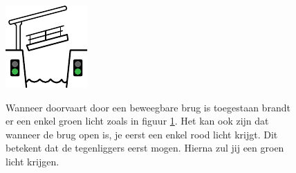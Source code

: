 \begin{figure}[H]
	\centering
	\begin{minipage}[b]{0.18\textwidth}
		\includegraphics[width=\textwidth,]{Hoofdstukken/Bruggen/pdf/brug_toegestaan.pdf}
		\caption{}
		\label{pic:brug:vrij}
	\end{minipage}
	\hfill
	\begin{minipage}[t]{0.75\textwidth}
		\vspace{-2.5cm}
		Wanneer doorvaart door een beweegbare brug is toegestaan brandt er een enkel groen licht zoals in figuur \ref{pic:brug:vrij}. Het kan ook zijn dat wanneer de brug open is, je eerst een enkel rood licht krijgt. Dit betekent dat de tegenliggers eerst mogen. Hierna zul jij een groen licht krijgen.
	\end{minipage}
\end{figure}
\vspace{-0.75cm}
